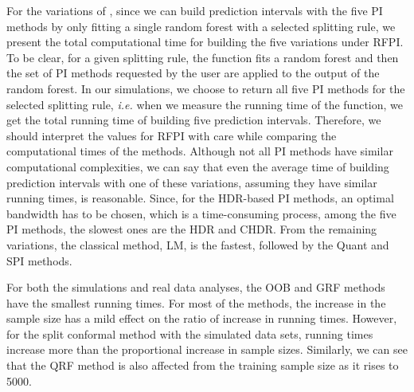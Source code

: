 For the variations of \cite{roy_prediction_2020}, since we can build prediction intervals with the five PI methods by only fitting a single random forest  with a selected splitting rule, we present the total computational time for building the five variations under RFPI. To be clear, for a given splitting rule, the  function fits a random forest and then the set of PI methods requested by the user are applied to the output of the random forest. In our simulations, we choose to return all five PI methods for the selected splitting rule, \emph{i.e.} when we measure the running time of the  function, we get the total running time of building five prediction intervals. Therefore, we should interpret the values for RFPI with care while comparing the computational times of the methods. Although not all PI methods have similar computational complexities, we can say that even the average time of building prediction intervals with one of these variations, assuming they have similar running times, is reasonable. Since, for the HDR-based PI methods, an optimal bandwidth has to be chosen, which is a time-consuming process, among the five PI methods, the slowest ones are the HDR and CHDR. From the remaining variations, the classical method, LM, is the fastest, followed by the Quant and SPI methods.

For both the simulations and real data analyses, the OOB and GRF methods have the smallest running times. For most of the methods, the increase in the sample size has a mild effect on the ratio of increase in running times. However, for the split conformal method with the simulated data sets, running times increase more than the proportional increase in sample sizes. Similarly, we can see that the QRF method is also affected from the training sample size as it rises to 5000.

